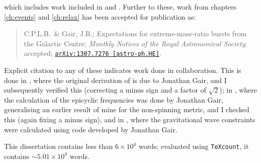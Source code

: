 which includes work included in  and . Further to these, work from chapters \ref{ch:events} and \ref{ch:relax} has been accepted for publication as:
\begin{quote}
C.P.L.B.\ \& Gair, J.R.; Expectations for extreme-mass-ratio bursts from the Galactic Centre; {\it Monthly Notices of the Royal Astronomical Society}; accepted; \href{http://arxiv.org/abs/1307.7276}{\tt arXiv:1307.7276 [astro-ph.HE]}.
\end{quote}
Explicit citation to any of these indicates work done in collaboration. This is done in , where the original derivation of  is due to Jonathan Gair, and I subsequently verified this (correcting a minus sign and a factor of $\sqrt{2}$); in , where the calculation of the epicyclic frequencies was done by Jonathan Gair, generalising an earlier result of mine for the non-spinning metric, and I checked this (again fixing a minus sign), and in , where the gravitational wave constraints were calculated using code developed by Jonathan Gair.

This dissertation contains less than $6 \times 10^4$ words; evaluated using \texttt{TeXcount}, it contains $\sim 5.01 \times 10^4$ words.
